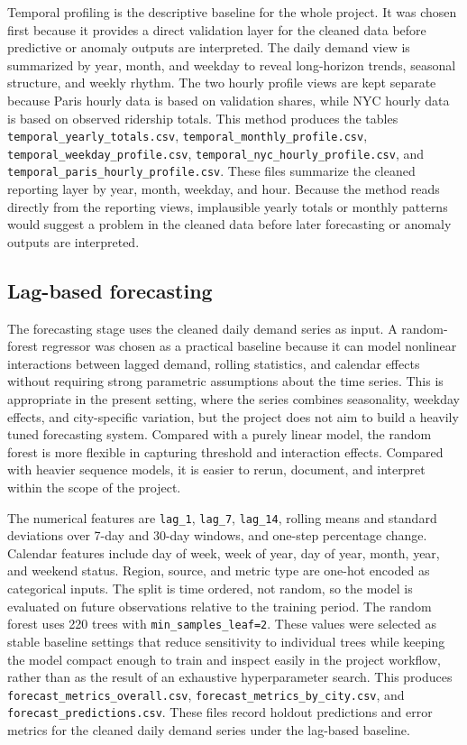 \documentclass[10pt,twocolumn,a4paper]{article}
\begin{document}
Temporal profiling is the descriptive baseline for the whole project. It was
chosen first because it provides a direct validation layer for the cleaned data
before predictive or anomaly outputs are interpreted. The daily demand view is
summarized by year, month, and weekday to reveal long-horizon trends, seasonal
structure, and weekly rhythm. The two hourly profile views are kept separate
because Paris hourly data is based on validation shares, while NYC hourly data
is based on observed ridership totals. This method produces the tables
\nolinkurl{temporal_yearly_totals.csv},
\nolinkurl{temporal_monthly_profile.csv},
\nolinkurl{temporal_weekday_profile.csv},
\nolinkurl{temporal_nyc_hourly_profile.csv}, and
\nolinkurl{temporal_paris_hourly_profile.csv}. These files summarize the
cleaned reporting layer by year, month, weekday, and hour. Because the method
reads directly from the reporting views, implausible yearly totals or monthly
patterns would suggest a problem in the cleaned data before later forecasting
or anomaly outputs are interpreted.

\subsection{Lag-based forecasting}

The forecasting stage uses the cleaned daily demand series as input. A
random-forest regressor was chosen as a practical baseline because it can model
nonlinear interactions between lagged demand, rolling statistics, and calendar
effects without requiring strong parametric assumptions about the time series.
This is appropriate in the present setting, where the series combines
seasonality, weekday effects, and city-specific variation, but the project does
not aim to build a heavily tuned forecasting system. Compared with a purely
linear model, the random forest is more flexible in capturing threshold and
interaction effects. Compared with heavier sequence models, it is easier to
rerun, document, and interpret within the scope of the project.

The numerical features are \texttt{lag\_1}, \texttt{lag\_7},
\texttt{lag\_14}, rolling means and standard deviations over 7-day and 30-day
windows, and one-step percentage change. Calendar features include day of week,
week of year, day of year, month, year, and weekend status. Region, source, and
metric type are one-hot encoded as categorical inputs. The split is time
ordered, not random, so the model is evaluated on future observations relative
to the training period. The random forest uses 220 trees with
\texttt{min\_samples\_leaf=2}. These values were selected as stable baseline
settings that reduce sensitivity to individual trees while keeping the model
compact enough to train and inspect easily in the project workflow, rather than
as the result of an exhaustive hyperparameter search. This produces
\nolinkurl{forecast_metrics_overall.csv},
\nolinkurl{forecast_metrics_by_city.csv}, and
\nolinkurl{forecast_predictions.csv}. These files record holdout predictions
and error metrics for the cleaned daily demand series under the lag-based
baseline.
\end{document}
